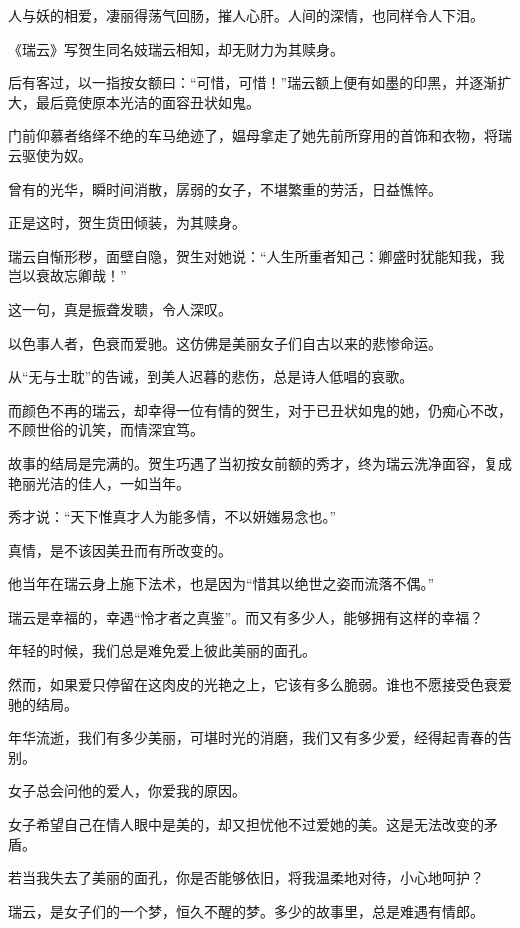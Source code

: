 		\vspace{1em}
		人与妖的相爱，凄丽得荡气回肠，摧人心肝。人间的深情，也同样令人下泪。\par
		《瑞云》写贺生同名妓瑞云相知，却无财力为其赎身。\par
		后有客过，以一指按女额曰：“可惜，可惜！”瑞云额上便有如墨的印黑，并逐渐扩大，最后竟使原本光洁的面容丑状如鬼。\par
		门前仰慕者络绎不绝的车马绝迹了，媪母拿走了她先前所穿用的首饰和衣物，将瑞云驱使为奴。\par
		曾有的光华，瞬时间消散，孱弱的女子，不堪繁重的劳活，日益憔悴。\par
		正是这时，贺生货田倾装，为其赎身。\par
		瑞云自惭形秽，面壁自隐，贺生对她说：“人生所重者知己：卿盛时犹能知我，我岂以衰故忘卿哉！”\par
		这一句，真是振聋发聩，令人深叹。\par
		以色事人者，色衰而爱驰。这仿佛是美丽女子们自古以来的悲惨命运。\par
		从“无与士耽”的告诫，到美人迟暮的悲伤，总是诗人低唱的哀歌。\par
		而颜色不再的瑞云，却幸得一位有情的贺生，对于已丑状如鬼的她，仍痴心不改，不顾世俗的讥笑，而情深宜笃。\par
		故事的结局是完满的。贺生巧遇了当初按女前额的秀才，终为瑞云洗净面容，复成艳丽光洁的佳人，一如当年。\par
		秀才说：“天下惟真才人为能多情，不以妍媸易念也。”\par
		真情，是不该因美丑而有所改变的。\par
		他当年在瑞云身上施下法术，也是因为“惜其以绝世之姿而流落不偶。”

		\vspace{1em}
		瑞云是幸福的，幸遇“怜才者之真鉴”。而又有多少人，能够拥有这样的幸福？\par
		年轻的时候，我们总是难免爱上彼此美丽的面孔。\par
		然而，如果爱只停留在这肉皮的光艳之上，它该有多么脆弱。谁也不愿接受色衰爱驰的结局。\par
		年华流逝，我们有多少美丽，可堪时光的消磨，我们又有多少爱，经得起青春的告别。\par
		女子总会问他的爱人，你爱我的原因。\par
		女子希望自己在情人眼中是美的，却又担忧他不过爱她的美。这是无法改变的矛盾。

		\vspace{1em}
		若当我失去了美丽的面孔，你是否能够依旧，将我温柔地对待，小心地呵护？\par
		瑞云，是女子们的一个梦，恒久不醒的梦。多少的故事里，总是难遇有情郎。


